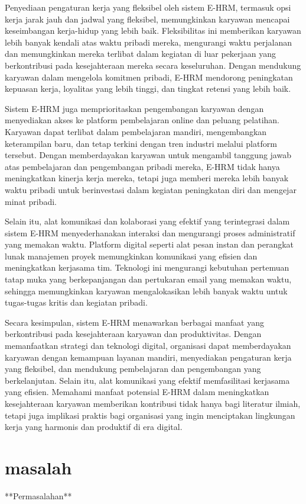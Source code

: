 \documentclass{article}
\begin{document}
Penyediaan pengaturan kerja yang fleksibel oleh sistem E-HRM, termasuk opsi kerja jarak jauh dan jadwal yang fleksibel, memungkinkan karyawan mencapai keseimbangan kerja-hidup yang lebih baik. Fleksibilitas ini memberikan karyawan lebih banyak kendali atas waktu pribadi mereka, mengurangi waktu perjalanan dan memungkinkan mereka terlibat dalam kegiatan di luar pekerjaan yang berkontribusi pada kesejahteraan mereka secara keseluruhan. Dengan mendukung karyawan dalam mengelola komitmen pribadi, E-HRM mendorong peningkatan kepuasan kerja, loyalitas yang lebih tinggi, dan tingkat retensi yang lebih baik.

Sistem E-HRM juga memprioritaskan pengembangan karyawan dengan menyediakan akses ke platform pembelajaran online dan peluang pelatihan. Karyawan dapat terlibat dalam pembelajaran mandiri, mengembangkan keterampilan baru, dan tetap terkini dengan tren industri melalui platform tersebut. Dengan memberdayakan karyawan untuk mengambil tanggung jawab atas pembelajaran dan pengembangan pribadi mereka, E-HRM tidak hanya meningkatkan kinerja kerja mereka, tetapi juga memberi mereka lebih banyak waktu pribadi untuk berinvestasi dalam kegiatan peningkatan diri dan mengejar minat pribadi.

Selain itu, alat komunikasi dan kolaborasi yang efektif yang terintegrasi dalam sistem E-HRM menyederhanakan interaksi dan mengurangi proses administratif yang memakan waktu. Platform digital seperti alat pesan instan dan perangkat lunak manajemen proyek memungkinkan komunikasi yang efisien dan meningkatkan kerjasama tim. Teknologi ini mengurangi kebutuhan pertemuan tatap muka yang berkepanjangan dan pertukaran email yang memakan waktu, sehingga memungkinkan karyawan mengalokasikan lebih banyak waktu untuk tugas-tugas kritis dan kegiatan pribadi.

Secara kesimpulan, sistem E-HRM menawarkan berbagai manfaat yang berkontribusi pada kesejahteraan karyawan dan produktivitas. Dengan memanfaatkan strategi dan teknologi digital, organisasi dapat memberdayakan karyawan dengan kemampuan layanan mandiri, menyediakan pengaturan kerja yang fleksibel, dan mendukung pembelajaran dan pengembangan yang berkelanjutan. Selain itu, alat komunikasi yang efektif memfasilitasi kerjasama yang efisien. Memahami manfaat potensial E-HRM dalam meningkatkan kesejahteraan karyawan memberikan kontribusi tidak hanya bagi literatur ilmiah, tetapi juga implikasi praktis bagi organisasi yang ingin menciptakan lingkungan kerja yang harmonis dan produktif di era digital.   
\section*{masalah}
**Permasalahan**
\end{document}
